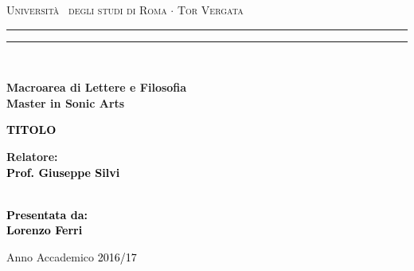 \documentclass[12pt,a4paper]{report}
\begin{document}
\begin{titlepage}
\begin{center}
{\Large{\textsc{Università  degli studi di Roma $\cdot$ Tor Vergata}}} 
\rule[0.1cm]{15.8cm}{0.1mm}
\rule[0.5cm]{15.8cm}{0.6mm}
\\\vspace{3mm}

{\small{\bf Macroarea di Lettere e Filosofia \\ Master in Sonic Arts}}

\end{center}

\vspace{23mm}

\begin{center}
\begin{spacing}{1.7}
\textcolor{black}{
\linespread{5}
{\LARGE{\bf 
TITOLO
}}}

\end{spacing}
\end{center}

\vspace{50mm} \par \noindent

\begin{minipage}[t]{0.47\textwidth}

{\large{\bf Relatore: \vspace{2mm}\\\textcolor{black}{
Prof. Giuseppe Silvi}\\\\

}
}
\end{minipage}
%
\hfill
%
\begin{minipage}[t]{0.47\textwidth}\raggedleft \textcolor{black}{
{\large{\bf Presentata da: \\
\vspace{2mm}
%
%
Lorenzo Ferri}}}
\end{minipage}

\vspace{17mm}

\begin{center}

{\large{%

Anno Accademico \textcolor{black}{2016/17}}}
\end{center}

\newpage\null\thispagestyle{empty}

\end{titlepage}
\end{document}

